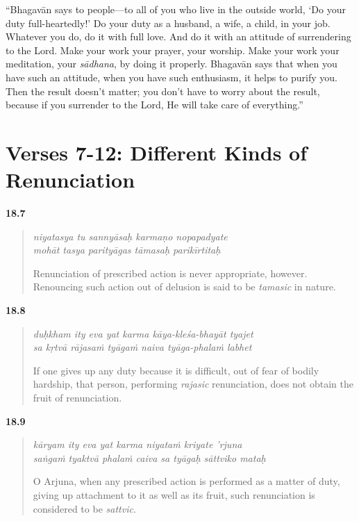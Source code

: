 \enquote{Bhagavān says to people---to all of you who live in the outside world, \enquote{Do your duty full-heartedly!} Do your duty as a husband, a wife, a child, in your job. Whatever you do, do it with full love. And do it with an attitude of surrendering to the Lord. Make your work your prayer, your worship. Make your work your meditation, your \textit{sādhana}, by doing it properly. Bhagavān says that when you have such an attitude, when you have such enthusiasm, it helps to purify you. Then the result doesn’t matter; you don’t have to worry about the result, because if you surrender to the Lord, He will take care of everything.}

\section{Verses 7-12: Different Kinds of Renunciation}\label{sec-verses-7-12-different-kinds-of-renunciation}


\par\noindent\textbf{18.7}\par
\begin{verse}
\textit{niyatasya tu sannyāsaḥ karmaṇo nopapadyate} \\
\textit{mohāt tasya parityāgas tāmasaḥ parikīrtitaḥ}

\noindent Renunciation of prescribed action is never appropriate, however. Renouncing such action out of delusion is said to be \textit{tamasic} in nature.
\end{verse}
\par



\par\noindent\textbf{18.8}\par
\begin{verse}
\textit{duḥkham ity eva yat karma kāya-kleśa-bhayāt tyajet} \\
\textit{sa kṛtvā rājasaṁ tyāgaṁ naiva tyāga-phalaṁ labhet}

\noindent If one gives up any duty because it is difficult, out of fear of bodily hardship, that person, performing \textit{rajasic} renunciation, does not obtain the fruit of renunciation.
\end{verse}
\par



\par\noindent\textbf{18.9}\par
\begin{verse}
\textit{kāryam ity eva yat karma niyataṁ kriyate ’rjuna} \\
\textit{saṅgaṁ tyaktvā phalaṁ caiva sa tyāgaḥ sāttviko mataḥ}

\noindent O Arjuna, when any prescribed action is performed as a matter of duty, giving up attachment to it as well as its fruit, such renunciation is considered to be \textit{sattvic}.
\end{verse}
\par



